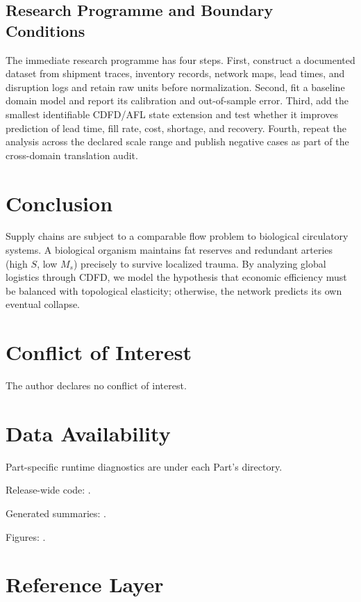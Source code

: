 \documentclass[11pt,a4paper]{article}
\begin{document}
\subsection{Research Programme and Boundary Conditions}

The immediate research programme has four steps. First, construct a documented
dataset from shipment traces, inventory records, network maps, lead times, and disruption logs and retain raw units before normalization.
Second, fit a baseline domain model and report its calibration and out-of-sample
error. Third, add the smallest identifiable CDFD/AFL state extension and test
whether it improves prediction of lead time, fill rate, cost, shortage, and recovery. Fourth, repeat the
analysis across the declared scale range and publish negative cases as part of
the cross-domain translation audit.


\section{Conclusion}
Supply chains are subject to a comparable flow problem to biological circulatory systems. A biological organism maintains fat reserves and redundant arteries (high $S$, low $M_s$) precisely to survive localized trauma. By analyzing global logistics through CDFD, we model the hypothesis that economic efficiency must be balanced with topological elasticity; otherwise, the network predicts its own eventual collapse.
\section*{Conflict of Interest} The author declares no conflict of interest.
\section*{Data Availability}
Part-specific runtime diagnostics are under each Part's  directory.

Release-wide code: .

Generated summaries: .

Figures: .


\section{Reference Layer}


\end{document}
